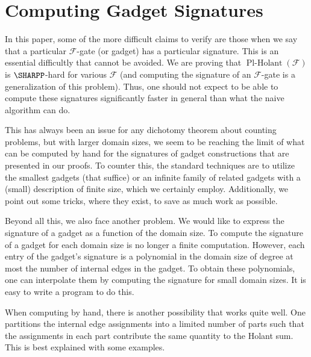 \documentclass[11pt]{article}
\newcommand{\PlHolant}{\operatorname{Pl-Holant}}
\begin{document}



\appendix

\section{Computing Gadget Signatures} \label{sec:compute}

In this paper,
some of the more difficult claims to verify are those when we say that a particular $\mathcal{F}$-gate (or gadget) has a particular signature.
This is an essential difficultly that cannot be avoided.
We are proving that $\PlHolant(\mathcal{F})$ is $\SHARPP$-hard for various $\mathcal{F}$
(and computing the signature of an $\mathcal{F}$-gate is a generalization of this problem).
Thus, one should not expect to be able to compute these signatures significantly faster in general than what the naive algorithm can do.

This has always been an issue for any dichotomy theorem about counting problems,
but with larger domain sizes,
we seem to be reaching the limit of what can be computed by hand for the signatures of gadget constructions that are presented in our proofs.
To counter this,
the standard techniques are to utilize the smallest gadgets (that suffice)
or an infinite family of related gadgets with a (small) description of finite size,
which we certainly employ.
Additionally, we point out some tricks, where they exist, to save as much work as possible.

Beyond all this, we also face another problem.
We would like to express the signature of a gadget as a function of the domain size.
To compute the signature of a gadget for each domain size is no longer a finite computation.
However, each entry of the gadget's signature is a polynomial in the domain size of degree at most the number of internal edges in the gadget.
To obtain these polynomials,
one can interpolate them by computing the signature for small domain sizes.
It is easy to write a program to do this.

When computing by hand,
there is another possibility that works quite well.
One partitions the internal edge assignments into a limited number of parts such that the assignments in each part contribute the same quantity to the Holant sum.
This is best explained with some examples.
\end{document}

